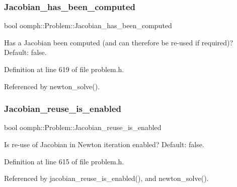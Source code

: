 \mbox{\label{classoomph_1_1Problem_a2c4702c75739c967ed582dbd0a7ba56f}} 
\subsubsection{\texorpdfstring{Jacobian\+\_\+has\+\_\+been\+\_\+computed}{Jacobian\_has\_been\_computed}}
{\footnotesize\ttfamily bool oomph\+::\+Problem\+::\+Jacobian\+\_\+has\+\_\+been\+\_\+computed\hspace{0.3cm}{\ttfamily [protected]}}



Has a Jacobian been computed (and can therefore be re-\/used if required)? Default\+: false. 



Definition at line 619 of file problem.\+h.



Referenced by newton\+\_\+solve().

\mbox{\label{classoomph_1_1Problem_a022796f2c96f2dff6ed1db2338c93aaf}} 
\subsubsection{\texorpdfstring{Jacobian\+\_\+reuse\+\_\+is\+\_\+enabled}{Jacobian\_reuse\_is\_enabled}}
{\footnotesize\ttfamily bool oomph\+::\+Problem\+::\+Jacobian\+\_\+reuse\+\_\+is\+\_\+enabled\hspace{0.3cm}{\ttfamily [protected]}}



Is re-\/use of Jacobian in Newton iteration enabled? Default\+: false. 



Definition at line 615 of file problem.\+h.



Referenced by jacobian\+\_\+reuse\+\_\+is\+\_\+enabled(), and newton\+\_\+solve().


